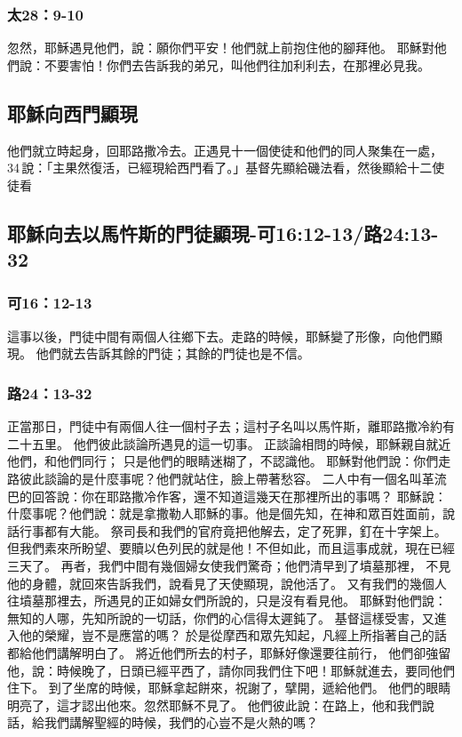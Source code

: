 \subsubsection{太28：9-10}
忽然，耶穌遇見他們，說：願你們平安！他們就上前抱住他的腳拜他。
耶穌對他們說：不要害怕！你們去告訴我的弟兄，叫他們往加利利去，在那裡必見我。

\subsection{耶穌向西門顯現}
他們就立時起身，回耶路撒冷去。正遇見十一個使徒和他們的同人聚集在一處， 34 說：「主果然復活，已經現給西門看了。」基督先顯給磯法看，然後顯給十二使徒看

\subsection{耶穌向去以馬忤斯的門徒顯現-可16:12-13/路24:13-32}
\subsubsection{可16：12-13}
這事以後，門徒中間有兩個人往鄉下去。走路的時候，耶穌變了形像，向他們顯現。
他們就去告訴其餘的門徒；其餘的門徒也是不信。

\subsubsection{路24：13-32}
正當那日，門徒中有兩個人往一個村子去；這村子名叫以馬忤斯，離耶路撒冷約有二十五里。
他們彼此談論所遇見的這一切事。
正談論相問的時候，耶穌親自就近他們，和他們同行；
只是他們的眼睛迷糊了，不認識他。
耶穌對他們說：你們走路彼此談論的是什麼事呢？他們就站住，臉上帶著愁容。
二人中有一個名叫革流巴的回答說：你在耶路撒冷作客，還不知道這幾天在那裡所出的事嗎？
耶穌說：什麼事呢？他們說：就是拿撒勒人耶穌的事。他是個先知，在神和眾百姓面前，說話行事都有大能。
祭司長和我們的官府竟把他解去，定了死罪，釘在十字架上。
但我們素來所盼望、要贖以色列民的就是他！不但如此，而且這事成就，現在已經三天了。
再者，我們中間有幾個婦女使我們驚奇；他們清早到了墳墓那裡，
不見他的身體，就回來告訴我們，說看見了天使顯現，說他活了。
又有我們的幾個人往墳墓那裡去，所遇見的正如婦女們所說的，只是沒有看見他。
耶穌對他們說：無知的人哪，先知所說的一切話，你們的心信得太遲鈍了。
基督這樣受害，又進入他的榮耀，豈不是應當的嗎？
於是從摩西和眾先知起，凡經上所指著自己的話都給他們講解明白了。
將近他們所去的村子，耶穌好像還要往前行，
他們卻強留他，說：時候晚了，日頭已經平西了，請你同我們住下吧！耶穌就進去，要同他們住下。
到了坐席的時候，耶穌拿起餅來，祝謝了，擘開，遞給他們。
他們的眼睛明亮了，這才認出他來。忽然耶穌不見了。
他們彼此說：在路上，他和我們說話，給我們講解聖經的時候，我們的心豈不是火熱的嗎？




